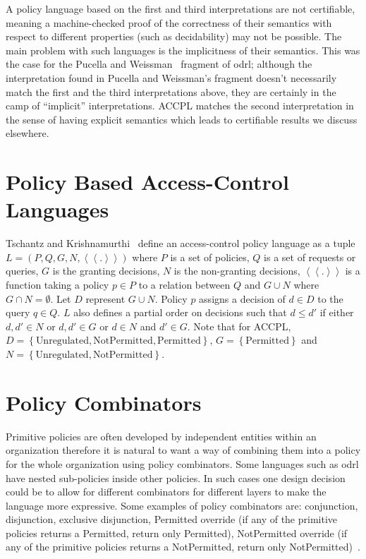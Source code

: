 A policy language based on the first and third interpretations are not certifiable, meaning a machine-checked proof of the correctness of their semantics with respect to different properties (such as decidability) may not be possible. The main problem with such languages is the implicitness of their semantics. This was the case for the Pucella and Weissman~\cite{pucella2006} fragment of \ac{odrl}; although the interpretation found in Pucella and Weissman's fragment doesn't necessarily match the first and the third interpretations above, they are certainly in the camp of ``implicit'' interpretations. \ac{ACCPL} matches the second interpretation in the sense of having explicit semantics which leads to certifiable results we discuss elsewhere.


\section{Policy Based Access-Control Languages}

Tschantz and Krishnamurthi~\cite{Tschantz} define an access-control policy language as a tuple $L = (P, Q, G, N, \left\langle\left\langle . \right\rangle\right\rangle)$ where $P$ is a set of policies, $Q$ is a set of requests or queries, $G$ is the granting decisions, $N$ is the non-granting decisions, $\left\langle\left\langle . \right\rangle\right\rangle$ is a function taking a policy $p \in P$ to a relation between $Q$ and $G \cup N$ where $G \cap N = \emptyset$. Let $D$ represent $G \cup N$. Policy $p$ assigns a decision of $d \in D$ to the query $q \in Q$. $L$ also defines a partial order on decisions such that $d \leq d'$ if either $d, d' \in N$ or $d, d' \in G$ or $d \in N$ and $d' \in G$. Note that for \ac{ACCPL}, $D = \left\{ {\text{Unregulated}, \text{NotPermitted}, \text{Permitted}}\right\}$, $G = \left\{ {\text{Permitted}}\right\}$ and $N = \left\{ {\text{Unregulated}, \text{NotPermitted}}\right\}$.


\section{Policy Combinators}\label{sec:policycombinators}

Primitive policies are often developed by independent entities within an organization therefore it is natural to want a way of combining them into a policy for the whole organization using policy combinators. Some languages such as \ac{odrl} have nested sub-policies inside other policies. In such cases one design decision could be to allow for different combinators for different layers to make the language more expressive. Some examples of policy combinators are: conjunction, disjunction, exclusive disjunction, Permitted override (if any of the primitive policies returns a Permitted, return only Permitted), NotPermitted override (if any of the primitive policies returns a NotPermitted, return only NotPermitted)~\cite{Tschantz}.

